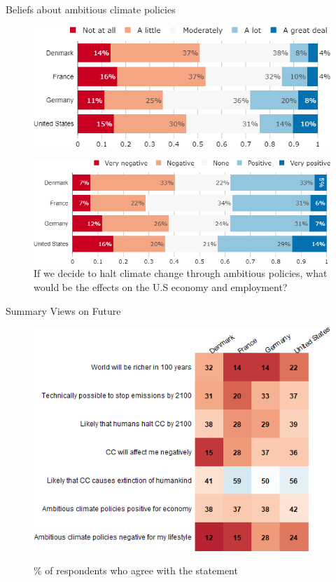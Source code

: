 \documentclass[aspectratio=169,9pt,dvipsnames]{beamer}
\begin{document}
\begin{frame}{Beliefs about ambitious climate policies}%
\begin{figure}[h!]
\centering
\caption{If we decide to halt climate change through ambitious policies, to what extent do you think it would negatively affect your lifestyle?}
\includegraphics[width=.59\textwidth]{../figures/country_comparison/effect_halt_CC_lifestyle_countries.png} \\
\caption{If we decide to halt climate change through ambitious policies, what would be the effects on the U.S economy and employment?}
\includegraphics[width=.59\textwidth]{../figures/country_comparison/effect_halt_CC_economy_countries.png}
\end{figure}
\end{frame}

\begin{frame}{Summary Views on Future}%
\begin{figure}[h!]
\centering
\caption{\% of respondents who agree with the statement}
\includegraphics[width=.59\textwidth]{../figures/country_comparison/future_positive_countries.png} \\
\end{figure}
\end{frame}
\end{document}
